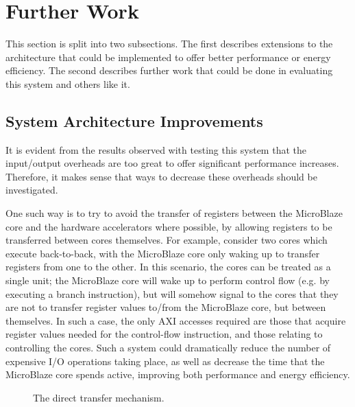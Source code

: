 \documentclass{UoYCSproject}
\begin{document}
\section{Further Work}

This section is split into two subsections. The first describes extensions to the architecture that could be implemented
to offer better performance or energy efficiency. The second describes further work that could be done in evaluating this
system and others like it.

\subsection{System Architecture Improvements}

It is evident from the results observed with testing this system that the input/output overheads are too great to
offer significant performance increases. Therefore, it makes sense that ways to decrease these overheads should be investigated.

One such way is to try to avoid the transfer of registers between the MicroBlaze core and the hardware accelerators where
possible, by allowing registers to be transferred between cores themselves. For example, consider two cores which
execute back-to-back, with the MicroBlaze core only waking up to transfer registers from one to the other. In this scenario,
the cores can be treated as a single unit; the MicroBlaze core will wake up to perform control flow (e.g. by executing a branch
instruction), but will somehow signal to the cores that they are not to transfer register values to/from the MicroBlaze core,
but between themselves. In such a case, the only AXI accesses required are those that acquire register values needed for the
control-flow instruction, and those relating to controlling the cores. Such a system could dramatically reduce the number
of expensive I/O operations taking place, as well as decrease the time that the MicroBlaze core spends active,
improving both performance and energy efficiency.

\begin{figure}[H]
\caption{The direct transfer mechanism.}
\label{fig:directTransfer}
\end{figure}
\end{document}
